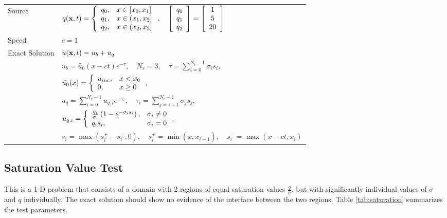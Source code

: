 \begin{table}[h]
\begin{tabular}{l l}
Source & $q(\mathbf{x},t)=\left\{\begin{array}{c l}
   q_0, & x\in[x_0,x_1]\\
   q_1, & x\in(x_1,x_2]\\
   q_2, & x\in(x_2,x_3]
   \end{array}\right.,\quad
   \left[\begin{array}{c}q_0\\q_1\\q_2\end{array}\right] =
      \left[\begin{array}{c}1\\5\\20\end{array}\right]$\\
Speed & $c=1$\\
Exact Solution & $u(\mathbf{x},t) = u_b + u_q$\\
   & $u_b=\tilde{u_0}(x-ct)e^{-\tau},
        \quad N_r=3,\quad
        \tau = \sum\limits_{i=0}^{N_r-1} \sigma_i s_i,$\\
   & $\tilde{u_0}(x) = \left\{\begin{array}{l l}
        u_{inc}, & x<x_0\\
        0,       & x\geq 0
     \end{array}\right.$,\\
   & $u_q=\sum\limits_{i=0}^{N_r-1}u_{q,i}e^{-\tau_i},\quad
        \tau_i = \sum\limits_{j=i+1}^{N_r-1} \sigma_j s_j,$\\
   & $u_{q,i} = \left\{\begin{array}{l l}
        \frac{q_i}{\sigma_i}\left(1-e^{-\sigma_i s_i}\right), & \sigma_i\neq 0\\
        q_i s_i, & \sigma_i = 0
        \end{array}\right.$,\\
   & $s_i = \max(s^+_i-s^-_i,0),\quad
     s^+_i = \min(x,x_{i+1}),\quad
     s^-_i = \max(x-ct,x_i)$ \\
\bottomrule\end{tabular}
\end{table}
\subsection{Saturation Value Test}\label{sec:saturation}
This is a 1-D problem that consists of a domain with 2 regions of equal
saturation values $\frac{q}{\sigma}$, but with significantly individual values
of $\sigma$ and $q$ individually. The exact solution should show no
evidence of the interface between the two regions.
Table \ref{tab:saturation} summarizes the test parameters.

